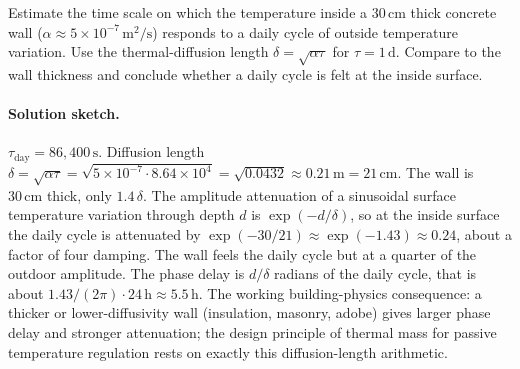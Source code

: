 \begin{exercise}
Estimate the time scale on which the temperature inside a $30\,
\si{\centi\meter}$ thick concrete wall ($\alpha \approx 5 \times
10^{-7}\,\si{\meter\squared\per\second}$) responds to a daily
cycle of outside temperature variation. Use the thermal-diffusion
length $\delta = \sqrt{\alpha \tau}$ for $\tau = 1\,\si{\day}$.
Compare to the wall thickness and conclude whether a daily cycle
is felt at the inside surface.

\paragraph{Solution sketch.}
$\tau_{\text{day}} = 86{,}400\,\si{\second}$. Diffusion length
$\delta = \sqrt{\alpha \tau} = \sqrt{5 \times 10^{-7} \cdot
8.64 \times 10^{4}} = \sqrt{0.0432} \approx 0.21\,\si{\meter} =
21\,\si{\centi\meter}$. The wall is $30\,\si{\centi\meter}$
thick, only $1.4\, \delta$. The amplitude attenuation of a
sinusoidal surface temperature variation through depth $d$ is
$\exp(-d/\delta)$, so at the inside surface the daily cycle is
attenuated by $\exp(-30/21) \approx \exp(-1.43) \approx 0.24$,
about a factor of four damping. The wall feels the daily cycle
but at a quarter of the outdoor amplitude. The phase delay is
$d/\delta$ radians of the daily cycle, that is about
$1.43/(2\pi) \cdot 24\,\si{\hour} \approx 5.5\,\si{\hour}$. The
working building-physics consequence: a thicker or
lower-diffusivity wall (insulation, masonry, adobe) gives larger
phase delay and stronger attenuation; the design principle of
thermal mass for passive temperature regulation rests on
exactly this diffusion-length arithmetic.
\end{exercise}

